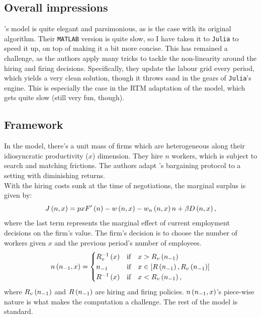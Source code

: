 \documentclass[12pt, leqno]{article}
\begin{document}
\subsection{Overall impressions}
\citet{elsby_marginal_2013}'s model is quite elegant and parsimonious, as is the case with its original algorithm. 
Their \texttt{MATLAB} version is quite slow, so I have taken it to \texttt{Julia} to speed it up, on top of making it a bit more concise. 
This has remained a challenge, as the authors apply many tricks to tackle the non-linearity around the hiring and firing decisions.
Specifically, they update the labour grid every period, which yields a very clean solution, though it throws sand in the gears of \texttt{Julia}'s engine. 
This is especially the case in the RTM adaptation of the model, which gets quite slow (still very fun, though). 
\subsection{Framework}
In the model, there's a unit mass of firms which are heterogeneous along their idiosyncratic productivity ($x$) dimension. 
They hire $n$ workers, which is subject to search and matching frictions. 
The authors adapt \citet{stole_intra-firm_1996}'s bargaining protocol to a setting with diminishing returns. \\

With the hiring costs sunk at the time of negotiations, the marginal surplus is given by:
\begin{equation}
    J\left( n,x \right)=px F'\left( n \right)- w\left( n,x \right)- w_n \left( n,x \right)n + \beta D\left( n,x \right),
\end{equation}
where the last term represents the marginal effect of current employment decisions on the firm's value. 
The firm's decision is to choose the number of workers given $x$ and the previous period's number of employees.
\begin{equation}
    n\left( n_{-1},x \right)=
    \begin{cases}
        R_v^{-1}\left( x \right)  & \text{if} \quad x > R_v\left( n_{-1} \right) \\
        n_{-1}          & \text{if} \quad x \in \left[ R\left( n_{-1} \right),R_v\left( n_{-1} \right) \right] \\
        R^{-1}\left( x \right)    & \text{if} \quad x < R_v\left( n_{-1} \right),
    \end{cases}
\end{equation}
where $R_v\left( n_{-1} \right)$ and $R\left( n_{-1} \right)$ are hiring and firing policies. 
$n\left( n_{-1},x \right)$'s piece-wise nature is what makes the computation a challenge. 
The rest of the model is standard. 
\end{document}

